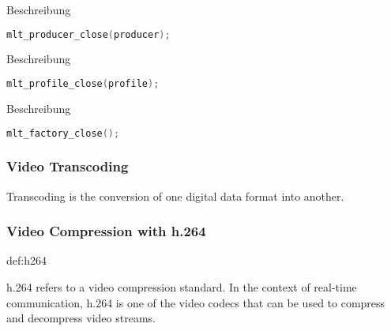 \documentclass[../MasterThesis.tex]{subfiles}
\begin{document}
\begin{description}[font=\normalfont\color{RedViolet!80!black}, style=nextline]
	\item[Close the producer] Beschreibung
	
	\begin{lstlisting}[language=C, numbers=none, basicstyle=\scriptsize\ttfamily]
	mlt_producer_close(producer); \end{lstlisting}
	
	\item[Close the profile] Beschreibung
	
	\begin{lstlisting}[language=C, numbers=none, basicstyle=\scriptsize\ttfamily]
	mlt_profile_close(profile); \end{lstlisting}
	
	\item[Close the factory] Beschreibung
	
	\begin{lstlisting}[language=C, numbers=none, basicstyle=\scriptsize\ttfamily]
	mlt_factory_close();
	\end{lstlisting}
	
	
\end{description}












\newpage
\subsubsection*{Video Transcoding} 

Transcoding is the conversion of one digital data format into another.~\cite{transcoding}







\subsubsection*{Video Compression with h.264} 

\begin{CountingDefinition}[h.264]{def:h264}
	
	h.264 refers to a video compression standard. In the context of real-time communication, h.264 is one of the video codecs that can be used to compress and decompress video streams.
	
\end{CountingDefinition}
\end{document}
